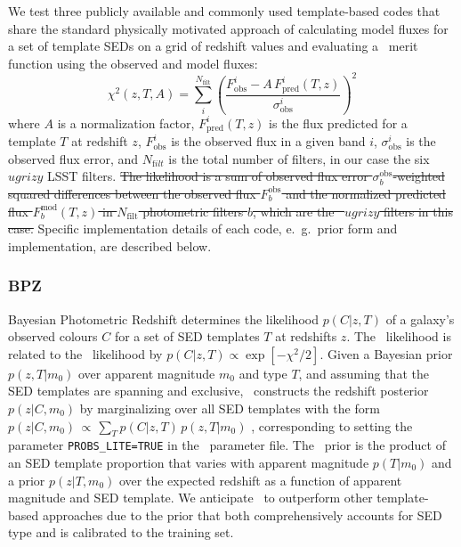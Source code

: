 We test three publicly available and commonly used template-based codes that share the standard physically motivated approach of calculating model fluxes for a set of template SEDs on a grid of redshift values and evaluating a \chisq\ merit function using the observed and model fluxes:
\begin{equation} \label{eq_temp_chi}
\chi^{2}(z,T,A) = \sum_{i}^{N_{\mathrm{filt}}}\left(\frac{F^{i}_{\mathrm{obs}} - A \, F^{i}_{\mathrm{pred}}(T,z)}{\sigma^{i}_{\mathrm{obs}}}\right)^2
\end{equation}
\noindent where $A$ is a normalization factor, $F^i_{\mathrm{pred}}(T,z)$ is the flux predicted for a template $T$ at redshift $z$, $F^i_{\mathrm{obs}}$ is the observed flux in a given band $i$, $\sigma^i_{\mathrm{obs}}$ is the observed flux error, and $N_{\mathrm filt}$ is the total number of filters, in our case the six $ugrizy$ LSST filters.  
\sout{The likelihood is a sum of observed flux error $\sigma_{b}^{\mathrm{obs}}$-weighted squared differences between the observed flux $F^{\mathrm{obs}}_{b}$ and the normalized predicted flux $F^{\mathrm{mod}}_{b}(T, z)$ in $N_{\mathrm{filt}}$ photometric filters $b$, which are the \lsst\ $ugrizy$ filters in this case.}
Specific implementation details of each code, e.~g.~prior form and implementation, are described below.

\subsubsection{BPZ}
\label{sec:BPZ}

Bayesian Photometric Redshift \citep[\bpz,][]{Benitez:00} determines the likelihood $p(C \vert z, T)$ of a galaxy's observed colours $C$ for a set of SED templates $T$ at redshifts $z$.
The \bpz\ likelihood is related to the \chisq\ likelihood by $p(C \vert z, T) \propto \exp[- \chi^{2} / 2]$.
Given a Bayesian prior $p(z, T \vert m_{0})$ over apparent magnitude $m_0$ and type $T$, and assuming that the SED templates are spanning and exclusive, \bpz\ constructs the redshift posterior $p(z \vert C, m_0)$ by marginalizing over all SED templates with the form $p(z|C,m_0)\,\propto\, \sum_{T}p(C|z,T)\,p(z,T|m_0)$ \citep[Eq.~3 from][]{Benitez:00}, corresponding to setting the parameter \texttt{PROBS\_LITE=TRUE} in the \bpz\ parameter file.
The \bpz\ prior is the product of an SED template proportion that varies with apparent magnitude $p(T \vert m_{0})$ and a prior $p(z \vert T, m_{0})$ over the expected redshift as a function of apparent magnitude and SED template.
We anticipate \bpz\ to outperform other template-based approaches due to the prior that both comprehensively accounts for SED type and is calibrated to the training set.

